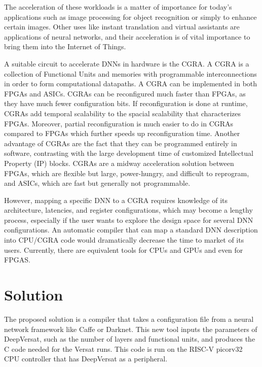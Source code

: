 The acceleration of these workloads is a matter of importance for today's
applications such as image processing for object recognition or simply to
enhance certain images. Other uses like instant translation and virtual
assistants are applications of neural networks, and their acceleration is of
vital importance to bring them into the Internet of Things.

A suitable circuit to accelerate DNNs in hardware is the CGRA. A CGRA is a
collection of Functional Units and memories with programmable interconnections
in order to form computational datapaths. A CGRA can be implemented in both
FPGAs and ASICs. CGRAs can be reconfigured much faster than FPGAs, as they have
much fewer configuration bits. If reconfiguration is done at runtime, CGRAs add
temporal scalability to the spacial scalability that characterizes
FPGAs. Moreover, partial reconfiguration is much easier to do in CGRAs compared
to FPGAs which further speeds up reconfiguration time. Another advantage of
CGRAs are the fact that they can be programmed entirely in software, contrasting
with the large development time of customized Intellectual Property (IP) blocks.
CGRAs are a midway acceleration solution between FPGAs, which are flexible but large, power-hungry, and difficult to
reprogram, and ASICs, which are fast but generally not programmable.

However, mapping a specific DNN to a CGRA requires knowledge of its
architecture, latencies, and register configurations, which may become a lengthy
process, especially if the user wants to explore the design space for several
DNN configurations. An automatic compiler that can map a standard DNN
description into CPU/CGRA code would dramatically decrease the time to market of its
users. Currently, there are equivalent tools for CPUs and GPUs and
even for FPGAS.


\section{Solution}
\label{section:solution}

The proposed solution is a compiler that takes a configuration file from a
neural network framework like Caffe or Darknet. This new tool inputs the
parameters of DeepVersat, such as the number of layers and functional units,
and produces the C code needed for the Versat runs. This code is run on the
RISC-V picorv32~\cite{picorv} CPU controller that has DeepVersat as a peripheral.

